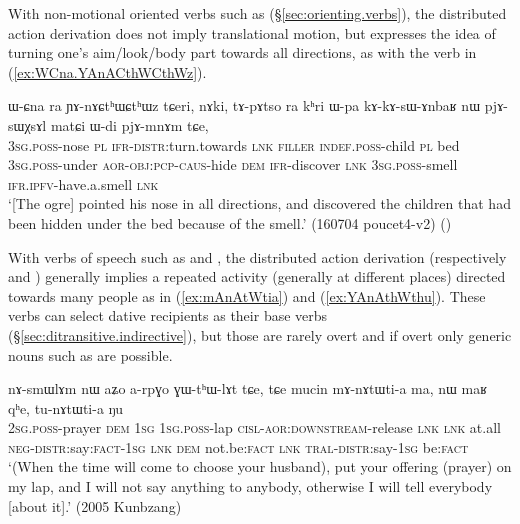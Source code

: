 With non-motional oriented verbs such as  (§\ref{sec:orienting.verbs}), the distributed action derivation does not imply translational motion, but expresses the idea of turning one's aim/look/body part towards all directions, as with the verb  in (\ref{ex:WCna.YAnACthWCthWz}).

\begin{exe}
\ex \label{ex:WCna.YAnACthWCthWz}
\gll  ɯ-ɕna ra ɲɤ-nɤɕtʰɯɕtʰɯz tɕeri, nɤki, tɤ-pɤtso ra kʰri ɯ-pa kɤ-kɤ-sɯ-ɤnbaʁ nɯ pjɤ-sɯχsɤl matɕi ɯ-di pjɤ-mnɤm tɕe, \\
\textsc{3sg}.\textsc{poss}-nose \textsc{pl} \textsc{ifr}-\textsc{distr}:turn.towards \textsc{lnk} \textsc{filler} \textsc{indef}.\textsc{poss}-child \textsc{pl} bed \textsc{3sg}.\textsc{poss}-under \textsc{aor}-\textsc{obj}:\textsc{pcp}-\textsc{caus}-hide \textsc{dem} \textsc{ifr}-discover \textsc{lnk} \textsc{3sg}.\textsc{poss}-smell \textsc{ifr}.\textsc{ipfv}-have.a.smell \textsc{lnk} \\
\glt `[The ogre] pointed his nose in all directions, and discovered the children that had been hidden under the bed because of the smell.' (160704 poucet4-v2)
()
\end{exe}

With verbs of speech such as  and , the distributed action derivation (respectively  and ) generally implies a repeated activity (generally at different places) directed towards many people as in (\ref{ex:mAnAtWtia}) and (\ref{ex:YAnAthWthu}). These verbs can select dative recipients as their base verbs (§\ref{sec:ditransitive.indirective}), but those are rarely overt and if overt only generic nouns such as  are possible.

\begin{exe}
\ex \label{ex:mAnAtWtia}
\gll  nɤ-smɯlɤm nɯ aʑo a-rpɣo ɣɯ-tʰɯ-lɤt tɕe, tɕe mucin mɤ-nɤtɯti-a ma,
nɯ maʁ qʰe, tu-nɤtɯti-a ŋu \\
\textsc{2sg}.\textsc{poss}-prayer \textsc{dem} \textsc{1sg} \textsc{1sg}.\textsc{poss}-lap \textsc{cisl}-\textsc{aor}:\textsc{downstream}-release \textsc{lnk} \textsc{lnk} at.all \textsc{neg}-\textsc{distr}:say:\textsc{fact}-\textsc{1sg} \textsc{lnk} \textsc{dem} not.be:\textsc{fact} \textsc{lnk} \textsc{tral}-\textsc{distr}:say-\textsc{1sg} be:\textsc{fact} \\
\glt `(When the time will come to choose your husband), put your offering (prayer) on my lap, and I will not say anything to anybody, otherwise I will tell everybody [about it].' (2005 Kunbzang)
\end{exe}

